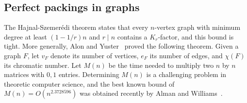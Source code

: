 \documentclass[11pt, letterpaper]{amsart}
\theoremstyle{plain}
\numberwithin{equation}{section}
\newtheorem{theorem}[thm]{Theorem}
\theoremstyle{definition}
\renewcommand{\vec}[1]{{\mathbf #1}}
\begin{document}




    

    \subsection{Perfect packings in graphs}

    The Hajnal-Szemer\'{e}di theorem states that every \(n\)-vertex graph with minimum degree at least \((1-1/r)n\) and \(r\mid n\) contains a \(K_r\)-factor, and this bound is tight. More generally, Alon and Yuster~\cite{alon1996h} proved the following theorem. Given a graph \(F\), let \(v_F\) denote its number of vertices, \(e_F\) its number of edges, and \(\chi (F)\) its chromatic number. Let \(M(n)\) be the time needed to multiply two $n$ by $n$ matrices with \(0,1\) entries. Determining $M(n)$ is a challenging problem in theoretic computer science, and the best known bound of $M(n) = O(n^{2.3728596})$ was obtained recently by Alman and Williams~\cite{alman2024refined}.
\end{document}
